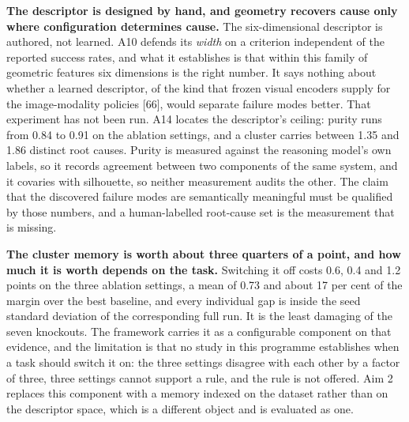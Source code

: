 \documentclass[
  11pt,
]{article}
\begin{document}
\textbf{The descriptor is designed by hand, and geometry recovers cause
only where configuration determines cause.} The six-dimensional
descriptor is authored, not learned. A10 defends its \emph{width} on a
criterion independent of the reported success rates, and what it
establishes is that within this family of geometric features six
dimensions is the right number. It says nothing about whether a learned
descriptor, of the kind that frozen visual encoders supply for the
image-modality policies {[}66{]}, would separate failure modes better.
That experiment has not been run. A14 locates the descriptor's ceiling:
purity runs from 0.84 to 0.91 on the ablation settings, and a cluster
carries between 1.35 and 1.86 distinct root causes. Purity is measured
against the reasoning model's own labels, so it records agreement
between two components of the same system, and it covaries with
silhouette, so neither measurement audits the other. The claim that the
discovered failure modes are semantically meaningful must be qualified
by those numbers, and a human-labelled root-cause set is the measurement
that is missing.

\textbf{The cluster memory is worth about three quarters of a point, and
how much it is worth depends on the task.} Switching it off costs 0.6,
0.4 and 1.2 points on the three ablation settings, a mean of 0.73 and
about 17 per cent of the margin over the best baseline, and every
individual gap is inside the seed standard deviation of the
corresponding full run. It is the least damaging of the seven knockouts.
The framework carries it as a configurable component on that evidence,
and the limitation is that no study in this programme establishes when a
task should switch it on: the three settings disagree with each other by
a factor of three, three settings cannot support a rule, and the rule is
not offered. Aim 2 replaces this component with a memory indexed on the
dataset rather than on the descriptor space, which is a different object
and is evaluated as one.
\end{document}
